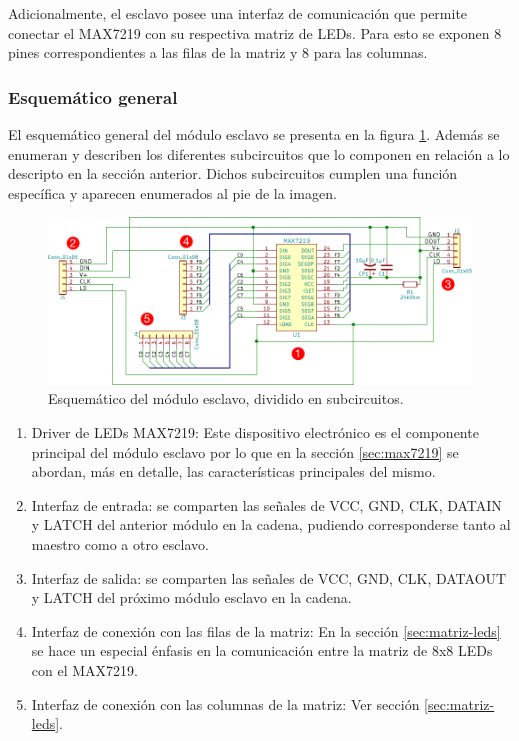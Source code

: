 Adicionalmente, el esclavo posee una interfaz de comunicación que permite conectar el MAX7219 con su respectiva matriz de LEDs. Para esto se exponen 8 pines correspondientes a las filas de la matriz y 8 para las columnas.

\subsubsection{Esquemático general}
El esquemático general del módulo esclavo se presenta en la figura \ref{fig:esquematico-esclavo}.
Además se enumeran y describen los diferentes subcircuitos que lo componen en relación a lo descripto en la sección anterior.
Dichos subcircuitos cumplen una función específica y aparecen enumerados al pie de la imagen.

\begin{figure}[ht!]
	\centering
	\includegraphics[width=\linewidth]{imagenes/esquematico-slave.pdf}
	\caption{Esquemático del módulo esclavo, dividido en subcircuitos.}
	\label{fig:esquematico-esclavo}
\end{figure}

\begin{enumerate}
	\item Driver de LEDs MAX7219: Este dispositivo electrónico es el componente principal del módulo esclavo por lo que en la sección \ref{sec:max7219} se abordan, más en detalle, las características principales del mismo.
	\item Interfaz de entrada: se comparten las señales de VCC, GND, CLK, DATAIN y LATCH del anterior módulo en la cadena, pudiendo corresponderse tanto al maestro como a otro esclavo.
	\item Interfaz de salida: se comparten las señales de VCC, GND, CLK, DATAOUT y LATCH del próximo módulo esclavo en la cadena.
	\item Interfaz de conexión con las filas de la matriz: En la sección \ref{sec:matriz-leds} se hace un especial énfasis en la comunicación entre la matriz de 8x8 LEDs con el MAX7219.
	\item Interfaz de conexión con las columnas de la matriz: Ver sección \ref{sec:matriz-leds}.
\end{enumerate}

